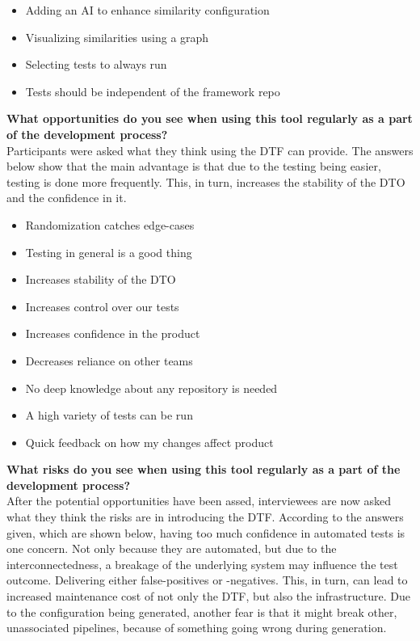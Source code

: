 \begin{itemize}
    \item Adding an AI to enhance similarity configuration
    \item Visualizing similarities using a graph
    \item Selecting tests to always run
    \item Tests should be independent of the framework repo
\end{itemize}

\textbf{What opportunities do you see when using this tool regularly as a part of the development process?}\\
Participants were asked what they think using the DTF can provide.
The answers below show that the main advantage is that due to the testing being easier, testing is done more frequently.
This, in turn, increases the stability of the DTO and the confidence in it.

\begin{itemize}
    \item Randomization catches edge-cases
    \item Testing in general is a good thing
    \item Increases stability of the DTO
    \item Increases control over our tests
    \item Increases confidence in the product
    \item Decreases reliance on other teams
    \item No deep knowledge about any repository is needed
    \item A high variety of tests can be run
    \item Quick feedback on how my changes affect product
\end{itemize}

\textbf{What risks do you see when using this tool regularly as a part of the development process?}\\
After the potential opportunities have been assed, interviewees are now asked what they think the risks are in introducing the DTF.
According to the answers given, which are shown below, having too much confidence in automated tests is one concern.
Not only because they are automated, but due to the interconnectedness, a breakage of the underlying system may influence the test outcome.
Delivering either false-positives or -negatives.
This, in turn, can lead to increased maintenance cost of not only the DTF, but also the infrastructure.
Due to the configuration being generated, another fear is that it might break other, unassociated pipelines, because of something going wrong during generation.

